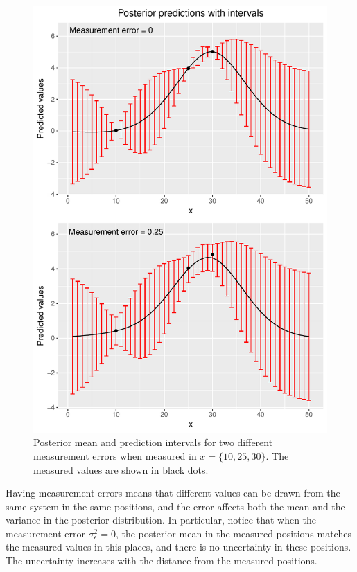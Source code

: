 \begin{figure}
    \centering
    \includegraphics[scale=0.95]{figures/predictions.pdf}
    \caption{Posterior mean and prediction intervals for two different measurement errors when measured in $x = \{10,25,30\}$. The measured values are shown in black dots.}
    \label{fig:predictions}
\end{figure}

Having measurement errors means that different values can be drawn from the same system in the same positions, and the error affects both the mean and the variance in the posterior distribution. In particular, notice that when the measurement error $\sigma^2_{\epsilon} = 0$, the posterior mean in the measured positions matches the measured values in this places, and there is no uncertainty in these positions. The uncertainty increases with the distance from the measured positions.

